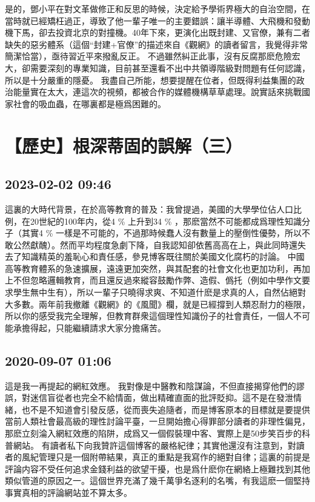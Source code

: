 \documentclass[twocolumn]{ctexart}
\begin{document}
是的，鄧小平在對文革做修正和反思的時候，決定給予學術界極大的自治空間，在當時就已經矯枉過正，導致了他一輩子唯一的主要錯誤：讓半導體、大飛機和發動機下馬，卻去投資北京的對撞機。40年下來，更演化出既封建、又官僚，兼有二者缺失的惡劣體系（這個“封建+官僚”的描述來自《觀網》的讀者留言，我覺得非常簡潔恰當），亟待習近平來撥亂反正。
不過雖然糾正此事，沒有反腐那麽危險宏大，卻需要深刻的專業知識，目前甚至還看不出中共領導階級對問題有任何認識，所以是十分嚴重的隱憂。
我盡自己所能，想要提醒在位者，但既得利益集團的政治能量實在太大，連這次的視頻，都被合作的媒體機構草草處理。說實話來挑戰國家社會的吸血蟲，在哪裏都是極爲困難的。
\section*{【歷史】根深蒂固的誤解（三）}
\subsection*{2023-02-02 09:46}

這裏的大時代背景，在於高等教育的普及：我曾提過，美國的大學學位佔人口比例，在20世紀的100年内，從4 \% 上升到34 \% ，那麽當然不可能都成爲理性知識分子（其實4 \% 一樣是不可能的，不過那時候蠢人沒有數量上的壓倒性優勢，所以不敢公然獻醜）。然而平均程度急劇下降，自我認知卻依舊高高在上，與此同時還失去了知識精英的羞恥心和責任感，參見博客既往關於美國文化腐朽的討論。
中國高等教育體系的急速擴展，遠遠更加突然，與其配套的社會文化也更加功利，再加上不但忽略邏輯教育，而且還反過來縱容鼓勵作弊、造假、僞托（例如中學作文要求學生無中生有），所以一輩子只曉得求爽、不知道什麽是求真的人，自然佔絕對大多數。兩年前我撤離《觀網》的《風聞》欄，就是已經撐到人類忍耐力的極限，所以你的感受我完全理解，但教育群衆這個理性知識份子的社會責任，一個人不可能承擔得起，只能繼續請求大家分擔痛苦。
\subsection*{2020-09-07 01:06}

這是我一再提起的網紅效應。
我對像是中醫教和陰謀論，不但直接揭穿他們的謬誤，對迷信盲從者也完全不給情面，做出精確直面的批評貶抑。這不是在發泄情緒，也不是不知道會引發反感，從而喪失追隨者，而是博客原本的目標就是要提供當前人類社會最高級的理性討論平臺，一旦開始擔心得罪部分讀者的非理性偏見，那麽立刻淪入網紅效應的陷阱，成爲又一個假裝理中客、實際上是50步笑百步的科普網站。
有讀者私下向我贊許這個博客的嚴格紀律；其實他還沒有注意到，對讀者的風紀管理只是一個附帶結果，真正的重點是我寫作的絕對自律；這裏的前提是評論内容不受任何追求金錢利益的欲望干擾，也是爲什麽你在網絡上極難找到其他類似管道的原因之一。這個世界充滿了幾千萬爭名逐利的名嘴，有我這麽一個堅持事實真相的評論網站並不算太多。
\end{document}
